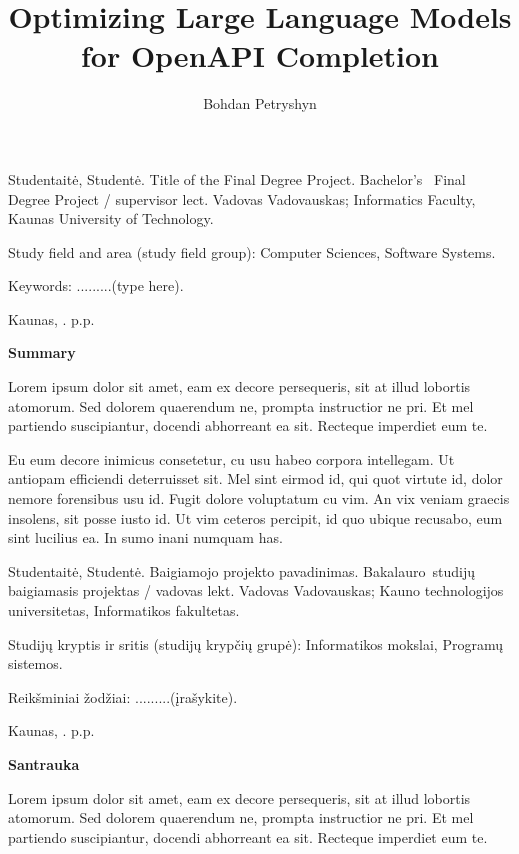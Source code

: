 \documentclass{ktuthesis}
\title{Optimizing Large Language Models for OpenAPI Completion}
\author{Bohdan Petryshyn}
\begin{document}
  \maketitle

  \thispagestyle{empty}
  Studentaitė, Studentė. Title of the Final Degree Project. Bachelor's  Final Degree Project / supervisor lect. Vadovas Vadovauskas; Informatics Faculty, Kaunas University of Technology.

  Study field and area (study field group): Computer Sciences, Software Systems.

  Keywords: .........(type here).

  Kaunas, \the\year. \pageref{LastPage} p.p.

  \begin{center}
    \textbf{Summary}
  \end{center}

  Lorem ipsum dolor sit amet, eam ex decore persequeris, sit at illud lobortis atomorum. Sed dolorem quaerendum ne, prompta instructior ne pri. Et mel partiendo suscipiantur, docendi abhorreant ea sit. Recteque imperdiet eum te.

  Eu eum decore inimicus consetetur, cu usu habeo corpora intellegam. Ut antiopam efficiendi deterruisset sit. Mel sint eirmod id, qui quot virtute id, dolor nemore forensibus usu id. Fugit dolore voluptatum cu vim. An vix veniam graecis insolens, sit posse iusto id. Ut vim ceteros percipit, id quo ubique recusabo, eum sint lucilius ea. In sumo inani numquam has.
  \clearpage

  \thispagestyle{empty}
  Studentaitė, Studentė. Baigiamojo projekto pavadinimas. Bakalauro studijų baigiamasis projektas / vadovas lekt. Vadovas Vadovauskas; Kauno technologijos universitetas, Informatikos fakultetas.

  Studijų kryptis ir sritis (studijų krypčių grupė): Informatikos mokslai, Programų sistemos.

  Reikšminiai žodžiai: .........(įrašykite).

  Kaunas, \the\year. \pageref{LastPage} p.p.

  \begin{center}
    \textbf{Santrauka}
  \end{center}

  Lorem ipsum dolor sit amet, eam ex decore persequeris, sit at illud lobortis atomorum. Sed dolorem quaerendum ne, prompta instructior ne pri. Et mel partiendo suscipiantur, docendi abhorreant ea sit. Recteque imperdiet eum te.
\end{document}

